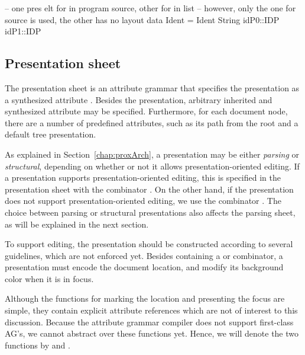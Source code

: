 -- one pres elt for in program source, other for in list
-- however, only the one for source is used, the other has no layout
data Ident = Ident String                                 { idP0::IDP idP1::IDP }

\ec

\subsection{Presentation sheet}

The presentation sheet is an attribute grammar that specifies the presentation as a synthesized attribute . Besides the presentation, arbitrary inherited and synthesized attribute may be specified. Furthermore, for each document node, there are a number of predefined attributes, such as its path from the root and a default tree presentation.


As explained in Section~\ref{chap:proxArch}, a presentation may be either {\em parsing} or {\em structural}, depending on whether or not it allows presentation-oriented editing. If a presentation supports presentation-oriented editing, this is specified in the presentation sheet with the combinator . On the other hand, if the presentation does not support presentation-oriented editing, we use the combinator .  The choice between parsing or structural presentations also affects the parsing sheet, as will be explained in the next section. 

To support editing, the presentation should be constructed according to several guidelines, which are not enforced yet. Besides containing a  or  combinator, a presentation must encode the document location, and modify its background color when it is in focus. 

Although the functions for marking the location and presenting the focus are simple, they contain explicit attribute references which are not of interest to this discussion. Because the attribute grammar compiler does not support first-class AG's, we cannot abstract over these functions yet. Hence, we will denote the two functions by  and . 


